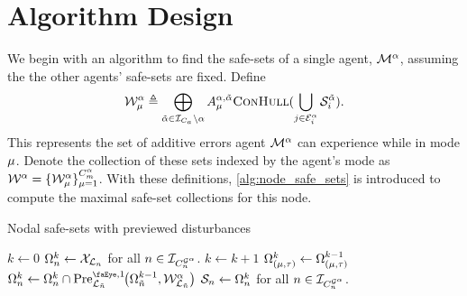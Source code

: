 \section{Algorithm Design}
We begin with an algorithm to find the safe-sets of a single agent, $\mathcal{M}^{\alpha}$, assuming the the other agents' safe-sets are fixed. Define 
\begin{equation}
\wcon[\agentidx][\modeidx]\triangleq\bigoplus_{\tilde{\agentidx}\in\idxset{\numagents}\setminus\agentidx}A_\modeidx^{\agentidx,\tilde{\agentidx}}\Call{ConHull}{\bigcup_{j\in\gnodeedges{i}^\agentidx}\mathcal{S}_i^{\tilde{\agentidx}}}.
\end{equation}
This represents the set of additive errors agent $\mathcal{M}^{\alpha}$ can experience while in mode ${\mu}$. Denote the collection of these sets indexed by the agent's mode as $\wconset{\agentidx}=\{\wcon[\agentidx][\modeidx]\}_{\modeidx=1}^{\nummodes[\agentidx]}$. With these definitions, \autoref{alg:node_safe_sets} is introduced to compute the maximal safe-set collections for this node. 
\begin{algorithm}[t]
\caption{Nodal safe-sets with previewed disturbances}\label{alg:node_safe_sets}
\begin{algorithmic}[1]
\State $k\gets0$
\State $\Omega_{n}^k\gets\xcon[\gnodelabel{n}]$ for all $n\in\idxset{\gnumnodes[\agentidx]}$.
\Repeat 
	\State $k\gets k+1$
		\State $\Omega_{({\mu},\tau)}^k\gets\Omega_{({\mu},\tau)}^{k-1}$
				\State $\Omega_{n}^k\gets\Omega_{n}^k\cap\PreviewedPre[\gnodelabel{\tilde{n}}][1]{\Omega_{\tilde{n}}^{k-1}, \wcon[\agentidx][\gnodelabel{\tilde{n}}]}$
			\EndFor
	\EndFor
{}
\State $\mathcal{S}_{n}\gets\Omega_{n}^k$ for all $n\in\idxset{\gnumnodes[\agentidx]}$.\;
\EndProcedure
\end{algorithmic}
\end{algorithm}

